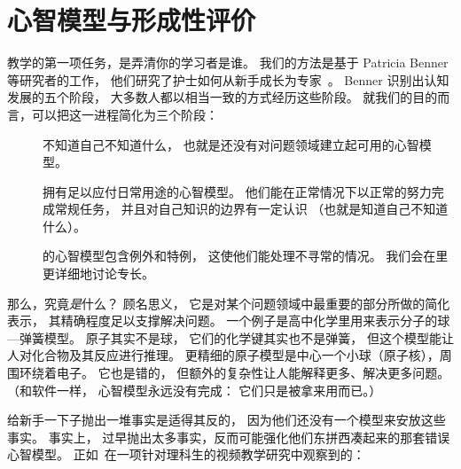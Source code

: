\chapter{心智模型与形成性评价}\label{s:models}

教学的第一项任务，是弄清你的学习者是谁。
我们的方法是基于 Patricia Benner 等研究者的工作，
他们研究了护士如何从新手成长为专家~\cite{Benn2000}。
Benner 识别出认知发展的五个阶段，
大多数人都以相当一致的方式经历这些阶段。
就我们的目的而言，可以把这一进程简化为三个阶段：

\begin{description}

\item[]
  不知道自己不知道什么，
  也就是还没有对问题领域建立起可用的心智模型。

\item[]
  拥有足以应付日常用途的心智模型。
  他们能在正常情况下以正常的努力完成常规任务，
  并且对自己知识的边界有一定认识
  （也就是知道自己不知道什么）。

\item[]
  的心智模型包含例外和特例，
  这使他们能处理不寻常的情况。
  我们会在里更详细地讨论专长。

\end{description}

那么，究竟\emph{是}什么？
顾名思义，
它是对某个问题领域中最重要的部分所做的简化表示，
其精确程度足以支撑解决问题。
一个例子是高中化学里用来表示分子的球—弹簧模型。
原子其实不是球，
它们的化学键其实也不是弹簧，
但这个模型能让人对化合物及其反应进行推理。
更精细的原子模型是中心一个小球（原子核），周围环绕着电子。
它也是错的，
但额外的复杂性让人能解释更多、解决更多问题。
（和软件一样，
心智模型永远没有完成：
它们只是被拿来用而已。）

给新手一下子抛出一堆事实是适得其反的，
因为他们还没有一个模型来安放这些事实。
事实上，
过早抛出太多事实，反而可能强化他们东拼西凑起来的那套错误心智模型。
正如~\cite{Mull2007a}在一项针对理科生的视频教学研究中观察到的：

